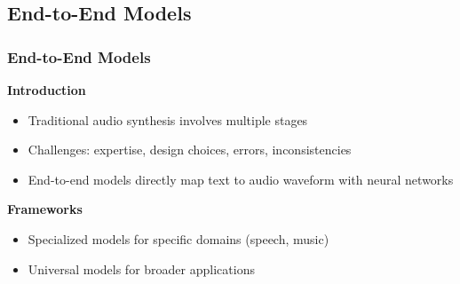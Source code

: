 \subsection{End-to-End Models}

\begin{frame}
    \frametitle{End-to-End Models}

    \textbf{Introduction}
    \begin{itemize}
        \item Traditional audio synthesis involves multiple stages
        \item Challenges: expertise, design choices, errors, inconsistencies
        \item End-to-end models directly map text to audio waveform with neural networks
    \end{itemize}

    \textbf{Frameworks}
    \begin{itemize}
        \item Specialized models for specific domains (speech, music)
        \item Universal models for broader applications
    \end{itemize}

\end{frame}

